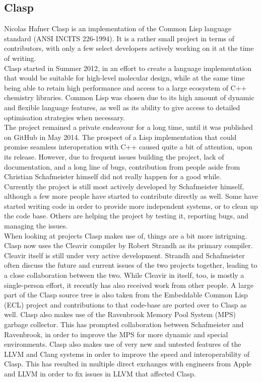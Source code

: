 \subsection{Clasp}{Nicolas Hafner}
Clasp\cite{clasp-github} is an implementation of the Common Lisp language standard (ANSI INCITS 226-1994). It is a rather small project in terms of contributors, with only a few select developers actively working on it at the time of writing. \\

Clasp started in Summer 2012\cite{clasp-timeline}, in an effort to create a language implementation that would be suitable for high-level molecular design, while at the same time being able to retain high performance and access to a large ecosystem of C++ chemistry libraries\cite{clasp-cando}. Common Lisp was chosen due to its high amount of dynamic and flexible language features, as well as its ability to give access to detailed optimisation strategies when necessary\cite{clasp-talk}. \\

The project remained a private endeavour for a long time, until it was published on GitHub in May 2014\cite{clasp-github}. The prospect of a Lisp implementation that could promise seamless interoperation with C++ caused quite a bit of attention, upon its release. However, due to frequent issues building the project, lack of documentation, and a long line of bugs, contribution from people aside from Christian Schafmeister himself did not really happen for a good while. \\

Currently the project is still most actively developed by Schafmeister himself, although a few more people have started to contribute directly as well. Some have started writing code in order to provide more independent systems, or to clean up the code base. Others are helping the project by testing it, reporting bugs, and managing the issues. \\

When looking at projects Clasp makes use of, things are a bit more intriguing. Clasp now uses the Cleavir compiler by Robert Strandh\cite{clasp-cleavir} as its primary compiler. Cleavir itself is still under very active development. Strandh and Schafmeister often discuss the future and current issues of the two projects together, leading to a close collaboration between the two. While Cleavir in itself, too, is mostly a single-person effort, it recently has also received work from other people. A large part of the Clasp source tree is also taken from the Embeddable Common Lisp (ECL)\cite{clasp-ecl} project and contributions to that code-base are ported over to Clasp as well. Clasp also makes use of the Ravenbrook Memory Pool System (MPS)\cite{clasp-mps} garbage collector. This has prompted collaboration between Schafmeister and Ravenbrook, in order to improve the MPS for more dynamic and special environments. Clasp also makes use of very new and untested features of the LLVM and Clang systems in order to improve the speed and interoperability of Clasp. This has resulted in multiple direct exchanges with engineers from Apple and LLVM in order to fix issues in LLVM that affected Clasp. \\

